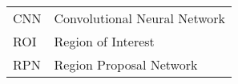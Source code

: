 \documentclass[thesis.tex]{subfiles}
\begin{document}

\begin{abbreviations}      

\noindent
\begin{tabular*}{\textwidth}{@{}p{} P{.8\textwidth}@{}}
CNN & Convolutional Neural Network \\
ROI & Region of Interest\\
RPN & Region Proposal Network\\

\end{tabular*}

\end{abbreviations}
\end{document}
